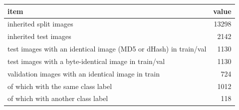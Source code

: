\begin{tabular}{lr}
\toprule
item & value \\
\midrule
inherited split images & 13298 \\
inherited test images & 2142 \\
test images with an identical image (MD5 or dHash) in train/val & 1130 \\
test images with a byte-identical image in train/val & 1130 \\
validation images with an identical image in train & 724 \\
of which with the same class label & 1012 \\
of which with another class label & 118 \\
\bottomrule
\end{tabular}
